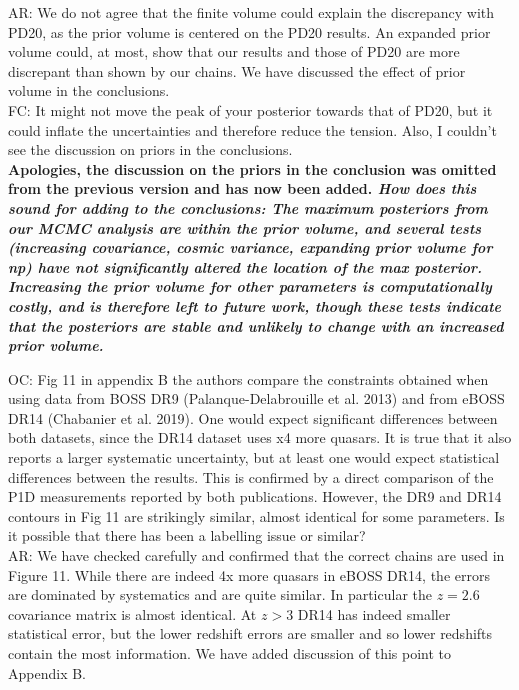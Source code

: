 \documentclass[12pt]{article}
\begin{document}
AR: We do not agree that the finite volume could explain the discrepancy with PD20, as the prior volume is centered on the PD20 results. An expanded prior volume could, at most, show that our results and those of PD20 are more discrepant than shown by our chains. We have discussed the effect of prior volume in the conclusions.\\

FC: It might not move the peak of your posterior towards that of PD20, but it could inflate the uncertainties and therefore reduce the tension. Also, I couldn’t see the discussion on priors in the conclusions.\\

\textbf{Apologies, the discussion on the priors in the conclusion was omitted from the previous version and has now been added. \textit{How does this sound for adding to the conclusions: The maximum posteriors from our MCMC analysis are within the prior volume, and several tests (increasing covariance, cosmic variance, expanding prior volume for np) have not significantly altered the location of the max posterior. Increasing the prior volume for other parameters is computationally costly, and is therefore left to future work, though these tests indicate that the posteriors are stable and unlikely to change with an increased prior volume.}}\\

\hrulefill \newline

OC: Fig 11 in appendix B the authors compare the constraints obtained when using data from BOSS DR9 (Palanque-Delabrouille et al. 2013) and from eBOSS DR14 (Chabanier et al. 2019). One would expect significant differences between both datasets, since the DR14 dataset uses x4 more quasars. It is true that it also reports a larger systematic uncertainty, but at least one would expect statistical differences between the results. This is confirmed by a direct comparison of the P1D measurements reported by both publications. However, the DR9 and DR14 contours in Fig 11 are strikingly similar, almost identical for some parameters. Is it possible that there has been a labelling issue or similar?\\

AR: We have checked carefully and confirmed that the correct chains are used in Figure 11. While there are indeed 4x more quasars in eBOSS DR14, the errors are dominated by systematics and are quite similar. In particular the $z=2.6$ covariance matrix is almost identical. At $z > 3$ DR14 has indeed smaller statistical error, but the lower redshift errors are smaller and so lower redshifts contain the most information. We have added discussion of this point to Appendix B.
\end{document}
